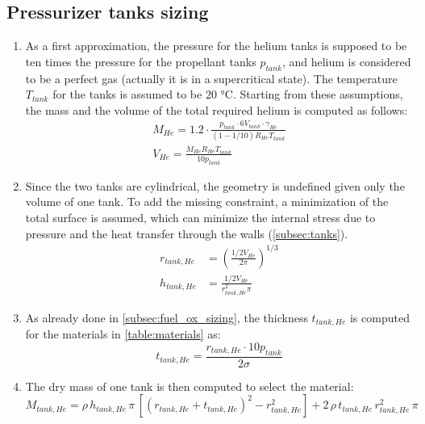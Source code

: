 \subsection{Pressurizer tanks sizing}
\label{subsec:helium_sizing}

\begin{enumerate}[itemsep=5mm]
    \item
    As a first approximation, the pressure for the helium tanks is supposed to be ten times the pressure for the propellant tanks $p_{tank}$, and helium is considered to be a perfect gas (actually it is in a supercritical state).
    The temperature $T_{tank}$ for the tanks is assumed to be $20$ °C. Starting from these assumptions, the mass and the volume of the total required helium is computed as follows:
    \begin{gather}
        M_{He} = 1.2 \cdot \frac{p_{tank} \cdot 6 V_{tank} \cdot \gamma_{He}}{\left( 1 - 1/10 \right) R_{He} T_{tank}}
        \\
        V_{He} = \frac{M_{He} R_{He} T_{tank}}{10 p_{tank}}
    \end{gather}

    \item
    Since the two tanks are cylindrical, the geometry is undefined given only the volume of one tank. To add the missing constraint, a minimization of the total surface is assumed, which can minimize the internal stress due to pressure and the heat transfer through the walls (\autoref{subsec:tanks}).
    \begin{align}
        r_{tank,He} &= \left( \frac{1/2 V_{He}}{2 \pi} \right)^{1/3}
        \\
        h_{tank,He} &= \frac{1/2 V_{He}}{r_{tank,He}^2 \pi}
    \end{align}

    \item
    As already done in \autoref{subsec:fuel_ox_sizing}, the thickness $t_{tank,He}$ is computed for the materials in \autoref{table:materials} as:
    \begin{equation}
        t_{tank,He} = \frac{r_{tank,He} \cdot 10 p_{tank}}{2 \sigma}
    \end{equation}

    \item
    The dry mass of one tank is then computed to select the material:
    \begin{equation}
        M_{tank,He} = \rho \, h_{tank,He} \, \pi \, \left[ \left( r_{tank,He} + t_{tank,He} \right)^2 - r_{tank,He}^2 \right] + 2 \, \rho \, t_{tank,He} \, r_{tank,He}^2 \, \pi
    \end{equation}
\end{enumerate}

